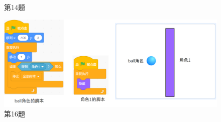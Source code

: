\documentclass[10pt, a4paper]{article}
\begin{document}
\begin{enumerate}
\begin{figure}[htbp]
\begin{minipage}[t]{.15\textwidth}
                \caption*{第14题}
            \end{minipage}
            \begin{minipage}[t]{.5\textwidth}
                \centering
                \includegraphics[width=\textwidth]{16-1.png}
                \caption*{第16题}
            \end{minipage}
            \begin{minipage}[t]{.13\textwidth}
                \centering

\end{minipage}
\end{figure}
\end{enumerate}
\end{document}
